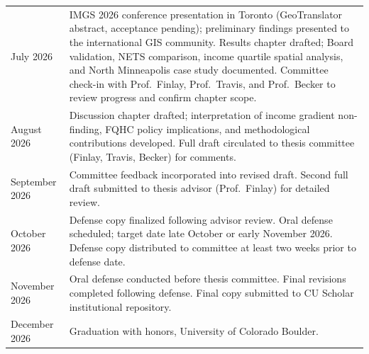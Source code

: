 \documentclass[12pt]{article}
\begin{document}
\begin{longtable}{>{\raggedright\arraybackslash}p{}
                  >{\raggedright\arraybackslash}p{}}
July 2026
&
IMGS 2026 conference presentation in Toronto (GeoTranslator abstract, acceptance pending); preliminary findings presented to the international GIS community.
Results chapter drafted; Board validation, NETS comparison, income quartile spatial analysis, and North Minneapolis case study documented.
Committee check-in with Prof.\ Finlay, Prof.\ Travis, and Prof.\ Becker to review progress and confirm chapter scope.
\\[0.8em]

August 2026
&
Discussion chapter drafted; interpretation of income gradient non-finding, FQHC policy implications, and methodological contributions developed.
Full draft circulated to thesis committee (Finlay, Travis, Becker) for comments.
\\[0.8em]

September 2026
&
Committee feedback incorporated into revised draft.
Second full draft submitted to thesis advisor (Prof.\ Finlay) for detailed review.
\\[0.8em]

October 2026
&
Defense copy finalized following advisor review.
Oral defense scheduled; target date late October or early November 2026.
Defense copy distributed to committee at least two weeks prior to defense date.
\\[0.8em]

November 2026
&
Oral defense conducted before thesis committee.
Final revisions completed following defense.
Final copy submitted to CU Scholar institutional repository.
\\[0.8em]

December 2026
&
Graduation with honors, University of Colorado Boulder.
\\

\end{longtable}
\end{document}
